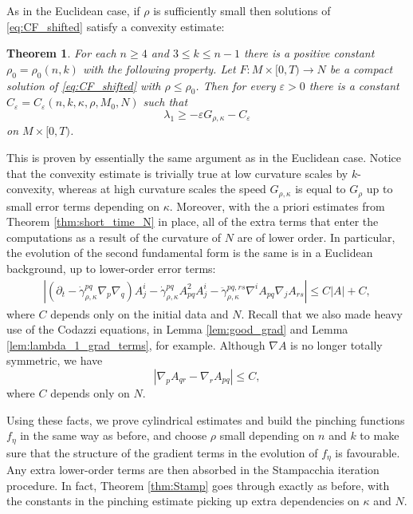 \documentclass[12pt]{amsart}
\newtheorem{theorem}{Theorem}[section]
\begin{document}
As in the Euclidean case, if $\rho$ is sufficiently small then solutions of \eqref{eq:CF_shifted} satisfy a convexity estimate:

\begin{theorem}
\label{thm:conv_est_N}
For each $n \geq 4$ and $3 \leq k \leq n-1$ there is a positive constant $\rho_0 = \rho_0(n,k)$ with the following property. Let $F : M\times [0,T) \to N$ be a compact solution of \eqref{eq:CF_shifted} with $\rho \leq \rho_0$. Then for every $\varepsilon >0$ there is a constant $C_\varepsilon = C_\varepsilon(n,k, \kappa, \rho, M_0, N)$ such that 
\[\lambda_1 \geq - \varepsilon G_{\rho,\kappa}- C_\varepsilon\]
on $M\times[0,T)$. 
\end{theorem}

This is proven by essentially the same argument as in the Euclidean case. Notice that the convexity estimate is trivially true at low curvature scales by $k$-convexity, whereas at high curvature scales the speed $G_{\rho, \kappa}$ is equal to $G_\rho$ up to small error terms depending on $\kappa$. Moreover, with the a priori estimates from Theorem \ref{thm:short_time_N} in place, all of the extra terms that enter the computations as a result of the curvature of $N$ are of lower order. In particular, the evolution of the second fundamental form is the same is in a Euclidean background, up to lower-order error terms:
\begin{align*}
|(\partial_t - \dot \gamma_{\rho,\kappa}^{pq} \nabla_p \nabla_q) A^i_j - \dot \gamma_{\rho,\kappa}^{pq} A_{pq}^2  A_j^i - \ddot \gamma_{\rho,\kappa}^{pq,rs} \nabla^i A_{pq} \nabla_j A_{rs}| \leq C|A| + C,
\end{align*}
where $C$ depends only on the initial data and $N$. Recall that we also made heavy use of the Codazzi equations, in Lemma \ref{lem:good_grad} and Lemma \ref{lem:lambda_1_grad_terms}, for example. Although $\nabla A$ is no longer totally symmetric, we have 
\[|\nabla_p A_{qr} - \nabla_r A_{pq}| \leq C,\]
where $C$ depends only on $N$. 

Using these facts, we prove cylindrical estimates and build the pinching functions $f_\eta$ in the same way as before, and choose $\rho$ small depending on $n$ and $k$ to make sure that the structure of the gradient terms in the evolution of $f_\eta$ is favourable. Any extra lower-order terms are then absorbed in the Stampacchia iteration procedure. In fact, Theorem \ref{thm:Stamp} goes through exactly as before, with the constants in the pinching estimate picking up extra dependencies on $\kappa$ and $N$. 
\end{document}
